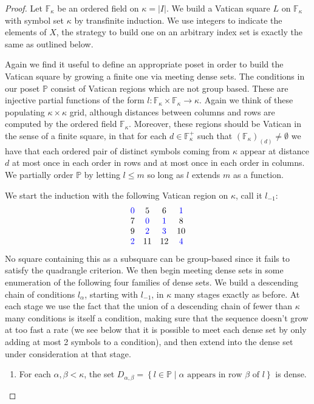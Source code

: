 \documentclass[12pt,a4paper]{article}
\newcommand{\F}{\mathbb{F}}
\newcommand{\To}{\longrightarrow}
\newcommand{\st}{\; | \;}
\newcommand{\set}[2]{\left\{#1\st #2 \right\}}
\renewcommand{\P}{\mathbb{P}}
\begin{document}
\begin{proof}
Let $\F_\kappa$ be an ordered field on $\kappa=|I|$.
We build a Vatican square $L$ on $\F_\kappa$ with symbol set $\kappa$ by transfinite induction. We use integers to indicate the elements of $X$, the strategy to build one on an arbitrary index set is exactly the same as outlined below.

Again we find it useful to define an appropriate poset in order to build the Vatican square by growing a finite one via meeting dense sets. The conditions in our poset $\P$ consist of Vatican regions which are not group based. These are injective partial functions of the form $l:\F_\kappa \times \F_\kappa\To\kappa$. Again we think of these populating $\kappa\times\kappa$ grid, although distances between columns and rows are computed by the ordered field $\F_\kappa$. Moreover, these regions should be Vatican in the sense of a finite square, in that for each $d\in \F_\kappa^+$ such that ${(\F_\kappa)}_{(d)}\neq\emptyset$ we have that each ordered pair of distinct symbols coming from $\kappa$ appear at distance $d$ at most once in each order in rows and at most once in each order in columns. We partially order $\P$ by letting $l \leq m$ so long as $l$ extends $m$ as a function.

We start the induction with the following Vatican region on $\kappa$, call it $l_{-1}$:
$$\begin{array}{cccc}
	\color{blue} 0 & 5 & 6 & \color{blue} 1 \\ 
	7 & \color{blue} 0 & \color{blue}1 & 8  \\
	9 & \color{blue}2 & \color{blue} 3 & 10 \\
	\color{blue} 2 & 11 & 12 & \color{blue} 4 
\end{array}$$
No square containing this as a subsquare can be group-based since it fails to satisfy the quadrangle criterion.
We then begin meeting dense sets in some enumeration of the following four families of dense sets.
We build a descending chain of conditions $l_\alpha$, starting with $l_{-1}$, in $\kappa$ many stages exactly as before. At each stage we use the fact that the union of a descending chain of fewer than $\kappa$ many conditions is itself a condition, making sure that the sequence doesn't grow at too fast a rate (we see below that it is possible to meet each dense set by only adding at most 2 symbols to a condition), and then extend into the dense set under consideration at that stage.

\begin{enumerate}
	\item For each $\alpha, \beta <\kappa$, the set $D_{\alpha,\beta}=\set{l \in \P}{\alpha \text{ appears in row } \beta \text{ of } l}$ is dense.
	

\end{enumerate}
\end{proof}
\end{document}
